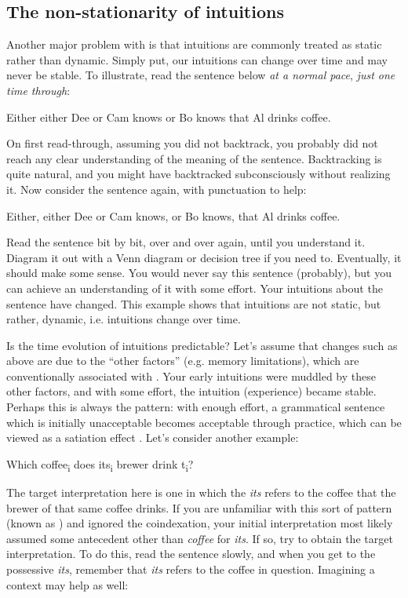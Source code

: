 \subsection{The non-stationarity of intuitions}

Another major problem with  is that intuitions are commonly treated as static rather than dynamic. Simply put, our intuitions can change over time and may never be stable. To illustrate, read the sentence below \textit{at a normal pace}, \textit{just one time through}:

\ea
    {Either either Dee or Cam knows or Bo knows that Al drinks coffee.}
\z    

On first read-through, assuming you did not backtrack, you probably did not reach any clear understanding of the meaning of the sentence. Backtracking is quite natural, and you might have backtracked subconsciously without realizing it. Now consider the sentence again, with punctuation to help:

\ea
Either, either Dee or Cam knows, or Bo knows, that Al drinks coffee.
\z

  Read the sentence bit by bit, over and over again, until you understand it. Diagram it out with a Venn diagram or decision tree if you need to. Eventually, it should make some sense. You would never say this sentence (probably), but you can achieve an understanding of it with some effort. Your intuitions about the sentence have changed. This example shows that intuitions are not static, but rather, dynamic, i.e. intuitions change over time.

  Is the time evolution of intuitions predictable? Let's assume that changes such as above are due to the “other factors” (e.g. memory limitations), which are conventionally associated with . Your early intuitions were muddled by these other factors, and with some effort, the intuition (experience) became stable. Perhaps this is always the pattern: with enough effort, a grammatical sentence which is initially unacceptable becomes acceptable through practice, which can be viewed as a satiation effect \citep{Snyder2000}. Let's consider another example:

\ea
Which coffee\textsubscript{i} does its\textsubscript{i} brewer drink t\textsubscript{i}?
\z

  The target interpretation here is one in which the  \textit{its} refers to the coffee that the brewer of that same coffee drinks. If you are unfamiliar with this sort of pattern (known as ) and ignored the coindexation, your initial interpretation most likely assumed some antecedent other than \textit{coffee} for \textit{its}. If so, try to obtain the target  interpretation. To do this, read the sentence slowly, and when you get to the possessive  \textit{its}, remember that \textit{its} refers to the coffee in question. Imagining a context may help as well:

